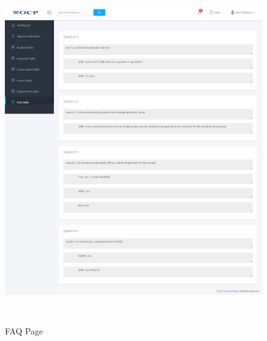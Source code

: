\begin{figure}[!h]
	\begin{center}
		\includegraphics[width=17cm,height=15cm]{FAQ}
	\end{center}
\caption{FAQ Page}
\end{figure}



